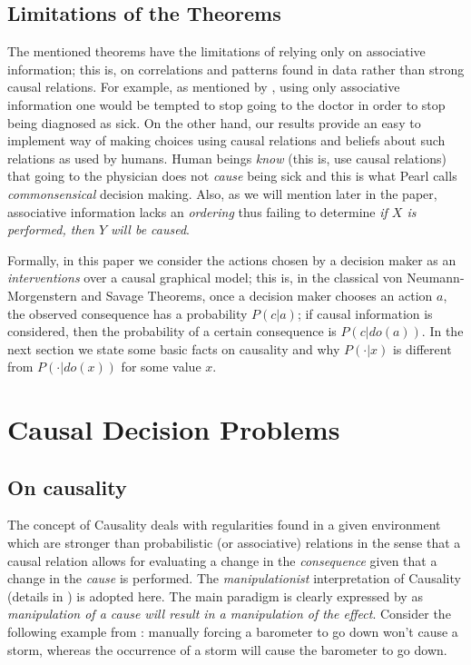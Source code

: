 \documentclass{svjour3}                     %
\begin{document}
\subsection{Limitations of the Theorems}
\label{theorems_limitations}
The mentioned theorems have the limitations of relying only on associative information; this is, on correlations and patterns found in data rather than strong causal relations. For example, as mentioned by \cite{pearl2009causality}, using only associative information one would be tempted to stop going to the doctor in order to stop being diagnosed as sick. On the other hand, our results provide an easy to implement way of making choices using causal relations and beliefs about such relations as used by humans. Human beings \textit{know} (this is, use causal relations) that going to the physician does not \textit{cause} being sick and this is what Pearl calls \textit{commonsensical} decision making. Also, as we will mention later in the paper, associative information lacks an \textit{ordering} thus failing to determine \textit{if $X$ is performed, then $Y$ will be caused}.

Formally, in this paper we consider the actions chosen by a decision maker as an \textit{interventions} over a causal graphical model; this is, in the classical von Neumann-Morgenstern and Savage Theorems, once a decision maker chooses an action $a$, the observed consequence has a probability $P(c|a)$; if causal information is considered, then the probability of a certain consequence is $P(c|do(a))$. In the next section we state some basic facts on causality and why $P(\cdot |x)$ is different from $P(\cdot | do(x))$ for some value $x$.

\section{Causal Decision Problems}
\label{causal_decision_problems}
\subsection{On causality}
\label{on_causality}
The concept of Causality deals with regularities found in a given environment which are stronger than probabilistic (or associative) relations in the sense that a causal relation allows for evaluating a change in the \textit{consequence} given that a change in the \textit{cause} is performed. The \textit{manipulationist} interpretation of Causality (details in \cite{woodward2005making}) is adopted here. The main paradigm is clearly expressed by \cite{campbell1979quasi} as \textit{manipulation of a cause will result in a manipulation of the effect}. Consider the following example from \cite{woodward2005making}: manually forcing a barometer to go down won't cause a storm, whereas the occurrence of a storm will cause the barometer to go down. 
\end{document}

